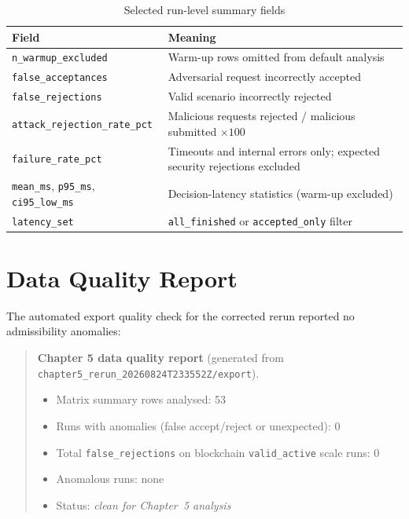 \begin{table}[htbp]
    \centering
    \caption{Selected run-level summary fields}
    \label{tab:app-summary-fields}
    \small
    \begin{tabular}{|p{}|p{}|}
        \hline
        \textbf{Field} & \textbf{Meaning} \\
        \hline
        \texttt{n\_warmup\_excluded} & Warm-up rows omitted from default analysis \\
        \hline
        \texttt{false\_acceptances} & Adversarial request incorrectly accepted \\
        \hline
        \texttt{false\_rejections} & Valid scenario incorrectly rejected \\
        \hline
        \texttt{attack\_rejection\_rate\_pct} & Malicious requests rejected / malicious submitted $\times 100$ \\
        \hline
        \texttt{failure\_rate\_pct} & Timeouts and internal errors only; expected security rejections excluded \\
        \hline
        \texttt{mean\_ms}, \texttt{p95\_ms}, \texttt{ci95\_low\_ms} & Decision-latency statistics (warm-up excluded) \\
        \hline
        \texttt{latency\_set} & \texttt{all\_finished} or \texttt{accepted\_only} filter \\
        \hline
    \end{tabular}
\end{table}

\section{Data Quality Report}
\label{app:data-quality}

The automated export quality check for the corrected rerun reported no admissibility anomalies:

\begin{quote}
\textbf{Chapter 5 data quality report} (generated from \texttt{chapter5\_rerun\_20260824T233552Z/export}).
\begin{itemize}
    \item Matrix summary rows analysed: 53
    \item Runs with anomalies (false accept/reject or unexpected): 0
    \item Total \texttt{false\_rejections} on blockchain \texttt{valid\_active} scale runs: 0
    \item Anomalous runs: none
    \item Status: \emph{clean for Chapter~5 analysis}
\end{itemize}
\end{quote}

